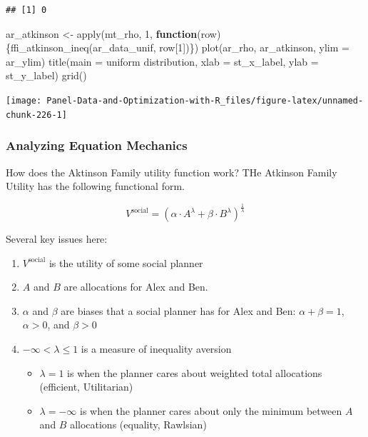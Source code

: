 \documentclass[
]{book}
\newenvironment{Shaded}{\begin{snugshade}}{\end{snugshade}}
\newcommand{\AttributeTok}[1]{\textcolor[rgb]{0.77,0.63,0.00}{#1}}
\newcommand{\ControlFlowTok}[1]{\textcolor[rgb]{0.13,0.29,0.53}{\textbf{#1}}}
\newcommand{\DecValTok}[1]{\textcolor[rgb]{0.00,0.00,0.81}{#1}}
\newcommand{\FunctionTok}[1]{\textcolor[rgb]{0.00,0.00,0.00}{#1}}
\newcommand{\NormalTok}[1]{#1}
\newcommand{\OtherTok}[1]{\textcolor[rgb]{0.56,0.35,0.01}{#1}}
\newcommand{\StringTok}[1]{\textcolor[rgb]{0.31,0.60,0.02}{#1}}
\providecommand{\tightlist}{%
  \setlength{\itemsep}{0pt}\setlength{\parskip}{0pt}}
\begin{document}
\begin{verbatim}
## [1] 0
\end{verbatim}

\begin{Shaded}
\begin{Highlighting}[]
\NormalTok{ar\_atkinson }\OtherTok{\textless{}{-}} \FunctionTok{apply}\NormalTok{(mt\_rho, }\DecValTok{1}\NormalTok{, }\ControlFlowTok{function}\NormalTok{(row)\{}\FunctionTok{ffi\_atkinson\_ineq}\NormalTok{(ar\_data\_unif, row[}\DecValTok{1}\NormalTok{])\})}
\FunctionTok{plot}\NormalTok{(ar\_rho, ar\_atkinson, }\AttributeTok{ylim =}\NormalTok{ ar\_ylim)}
\FunctionTok{title}\NormalTok{(}\AttributeTok{main =} \StringTok{\textquotesingle{}uniform distribution\textquotesingle{}}\NormalTok{, }\AttributeTok{xlab =}\NormalTok{ st\_x\_label, }\AttributeTok{ylab =}\NormalTok{ st\_y\_label)}
\FunctionTok{grid}\NormalTok{()}
\end{Highlighting}
\end{Shaded}

\begin{center}\texttt{[image: Panel-Data-and-Optimization-with-R\_files/figure-latex/unnamed-chunk-226-1]} \end{center}

\hypertarget{analyzing-equation-mechanics}{%
\subsubsection{Analyzing Equation Mechanics}\label{analyzing-equation-mechanics}}

How does the Aktinson Family utility function work? THe Atkinson Family Utility has the following functional form.

\[
V^{\text{social}}
=
\left(
\alpha
\cdot
A^{\lambda}
+
\beta
\cdot
B^{\lambda}
\right)^{\frac{1}{\lambda}}
\]

Several key issues here:

\begin{enumerate}
\def\labelenumi{\arabic{enumi}.}
\tightlist
\item
  \(V^{\text{social}}\) is the utility of some social planner
\item
  \(A\) and \(B\) are allocations for Alex and Ben.
\item
  \(\alpha\) and \(\beta\) are biases that a social planner has for Alex and Ben: \(\alpha+\beta=1\), \(\alpha>0\), and \(\beta>0\)
\item
  \(-\infty < \lambda \le 1\) is a measure of inequality aversion

  \begin{itemize}
  \tightlist
  \item
    \(\lambda=1\) is when the planner cares about weighted total allocations (efficient, Utilitarian)
  \item
    \(\lambda=-\infty\) is when the planner cares about only the minimum between \(A\) and \(B\) allocations (equality, Rawlsian)
  \end{itemize}
\end{enumerate}
\end{document}
